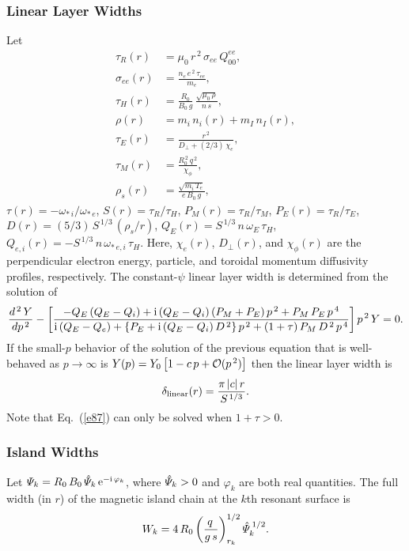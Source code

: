 \documentclass[12pt,prb,aps]{revtex4-1}
\begin{document}
\subsubsection{Linear Layer Widths}\label{linear}
Let
\begin{align}
\tau_R(r) &= \mu_0\,r^{\,2}\,\sigma_{ee}\,Q_{00}^{ee},\\[0.5ex]
\sigma_{ee}(r) &=\frac{n_e\,e^{\,2}\,\tau_{ee}}{m_e},\\[0.5ex]
\tau_H(r) &= \frac{R_0}{B_0\,g}\,\frac{\sqrt{\mu_0\,\rho}}{n\,s},\\[0.5ex]
\rho(r)&= m_i\,n_i(r)  + m_I\,n_I(r),\\[0.5ex]
\tau_E(r) &= \frac{r^{\,2}}{D_\perp + (2/3)\,\chi_e},\\[0.5ex]
\tau_M(r) &= \frac{R_0^{\,2}\,q^{\,2}}{\chi_\phi},\\[0.5ex]
\rho_s (r)&= \frac{\sqrt{m_i\,T_e}}{e\,B_0\,g},
\end{align}
$\tau(r) = -\omega_{\ast\,i}/\omega_{\ast\,e}$,
$S(r) = \tau_R/\tau_H$, 
$P_M(r) = \tau_R/\tau_M$,
$P_E(r) = \tau_R/\tau_E$,
$D(r)= (5/3)\,S^{\,1/3}\,(\rho_s/r)$,
$Q_E(r)= S^{\,1/3}\,n\,\omega_E\,\tau_H$, 
$Q_{e,i}(r)= -S^{\,1/3}\,n\,\omega_{\ast\,e,i}\,\tau_H$. 
Here, $\chi_e(r)$, $D_\perp(r)$, and $\chi_\phi(r)$ are the perpendicular electron energy, particle,
and toroidal momentum diffusivity profiles, respectively. 
The constant-$\psi$ linear layer width is determined from the solution of\,\cite{cole,cole1}
\begin{equation}\label{e87}
\frac{d^{\,2}\,Y}{dp^{\,2}} -\left[\frac{-Q_E\,(Q_E-Q_i)+{\rm i}\,(Q_E-Q_i)\,(P_M+P_E)\,p^{\,2}+
P_M\,P_E\,p^{\,4}}
{{\rm i}\,(Q_E-Q_e) +\{P_E + {\rm i}\,(Q_E-Q_i)\,D^{\,2}\}\,p^{\,2}+(1+\tau)\,P_M\,D^{\,2}\,p^{\,4}}
\right] p^{\,2}\, Y = 0.
\end{equation}
If the small-$p$ behavior of  the solution of the previous equation that is well-behaved as $p\rightarrow \infty$ is
$Y(p) = Y_0\left[1 - c\,p+{\cal O}(p^{\,2})\right]$
then the 
linear layer width is 
\begin{equation}
\delta_{\rm linear}(r) = \frac{\pi\,|c|\,r}{S^{\,1/3}}.
\end{equation}
Note that Eq.~(\ref{e87}) can only be solved when $1+\tau>0$. 

\subsubsection{Island Widths}
Let ${\mit\Psi}_k= R_0\,B_0\,\hat{\mit\Psi}_k\,{\rm e}^{-{\rm i}\,\varphi_k}$, where $\hat{\mit\Psi}_k>0$  and $\varphi_k$ are both real quantities.
The full width (in $r$) of the magnetic island chain at the
$k$th resonant surface is
\begin{equation}
W_k = 4\,R_0\left(\frac{q\,}{g\,s}\right)^{1/2}_{r_k}\hat{\mit\Psi}_k^{\,1/2}.
\end{equation}
\end{document}
